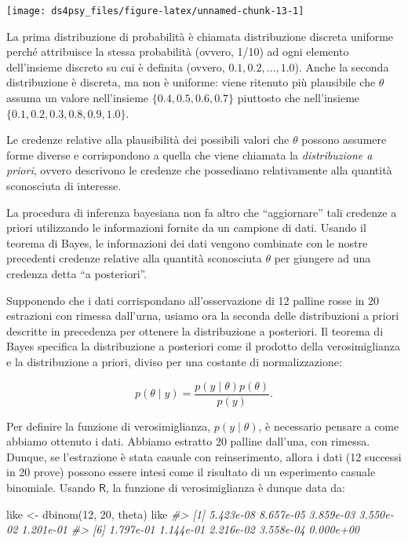 \documentclass[
  11pt,
]{krantz}
\makeatletter
\newenvironment{Shaded}{\begin{snugshade}}{\end{snugshade}}
\newcommand{\CommentTok}[1]{\textcolor[rgb]{0.37,0.37,0.37}{\textit{#1}}}
\newcommand{\DecValTok}[1]{\textcolor[rgb]{0.06,0.06,0.06}{#1}}
\newcommand{\FunctionTok}[1]{\textcolor[rgb]{0,0,0}{#1}}
\newcommand{\NormalTok}[1]{#1}
\newcommand{\OtherTok}[1]{\textcolor[rgb]{0.37,0.37,0.37}{#1}}
\newenvironment{kframe}{%
\medskip{}
\setlength{\fboxsep}{.8em}
 \def\at@end@of@kframe{}%
 \ifinner\ifhmode%
  \def\at@end@of@kframe{\end{minipage}}%
  \begin{minipage}{\columnwidth}%
 \fi\fi%
 \def\FrameCommand##1{\hskip\@totalleftmargin \hskip-\fboxsep
 \colorbox{shadecolor}{##1}\hskip-\fboxsep
     \hskip-\linewidth \hskip-\@totalleftmargin \hskip\columnwidth}%
 \MakeFramed {\advance\hsize-\width
   \@totalleftmargin\z@ \linewidth\hsize
   \@setminipage}}%
 {\par\unskip\endMakeFramed%
 \at@end@of@kframe}
\renewenvironment{Shaded}{\begin{kframe}}{\end{kframe}}
\theoremstyle{definition}
\theoremstyle{definition}
\theoremstyle{definition}
\theoremstyle{definition}
\theoremstyle{remark}
\makeatother
\begin{document}
\begin{center}\texttt{[image: ds4psy\_files/figure-latex/unnamed-chunk-13-1]} \end{center}

La prima distribuzione di probabilità è chiamata distribuzione discreta uniforme perché attribuisce la stessa probabilità (ovvero, 1/10) ad ogni elemento dell'insieme discreto su cui è definita (ovvero, \(0.1, 0.2, \dots, 1.0\)). Anche la seconda distribuzione è discreta, ma non è uniforme: viene ritenuto più plausibile che \(\theta\) assuma un valore nell'insieme \(\{0.4, 0.5, 0.6, 0.7\}\) piuttosto che nell'insieme \(\{0.1, 0.2, 0.3, 0.8, 0.9, 1.0\}\).

Le credenze relative alla plausibilità dei possibili valori che \(\theta\) possono assumere forme diverse e corrispondono a quella che viene chiamata la \emph{distribuzione a priori}, ovvero descrivono le credenze che possediamo relativamente alla quantità sconosciuta di interesse.

La procedura di inferenza bayesiana non fa altro che ``aggiornare'' tali credenze a priori utilizzando le informazioni fornite da un campione di dati. Usando il teorema di Bayes, le informazioni dei dati vengono combinate con le nostre precedenti credenze relative alla quantità sconosciuta \(\theta\) per giungere ad una credenza detta ``a posteriori''.

Supponendo che i dati corrispondano all'osservazione di 12 palline rosse in 20 estrazioni con rimessa dall'urna, usiamo ora la seconda delle distribuzioni a priori descritte in precedenza per ottenere la distribuzione a posteriori. Il teorema di Bayes specifica la distribuzione a posteriori come il prodotto della verosimiglianza e la distribuzione a priori, diviso per una costante di normalizzazione:

\[
p(\theta \mid y) = \frac{p(y \mid \theta)p(\theta)}{p(y)}.
\]

Per definire la funzione di verosimiglianza, \(p(y \mid \theta)\), è necessario pensare a come abbiamo ottenuto i dati. Abbiamo estratto 20 palline dall'una, con rimessa. Dunque, se l'estrazione è stata casuale con reinserimento, allora i dati (12 successi in 20 prove) possono essere intesi come il risultato di un esperimento casuale binomiale. Usando \(\textsf{R}\), la funzione di verosimiglianza è dunque data da:

\begin{Shaded}
\begin{Highlighting}[]
\NormalTok{like }\OtherTok{\textless{}{-}} \FunctionTok{dbinom}\NormalTok{(}\DecValTok{12}\NormalTok{, }\DecValTok{20}\NormalTok{, theta)}
\NormalTok{like}
\CommentTok{\#\textgreater{}  [1] 5.423e{-}08 8.657e{-}05 3.859e{-}03 3.550e{-}02 1.201e{-}01}
\CommentTok{\#\textgreater{}  [6] 1.797e{-}01 1.144e{-}01 2.216e{-}02 3.558e{-}04 0.000e+00}
\end{Highlighting}
\end{Shaded}
\end{document}
